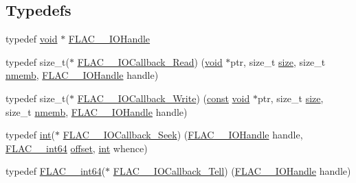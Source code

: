 \subsection*{Typedefs}
\begin{DoxyCompactItemize}
\item 
typedef \hyperlink{sound_8c_ae35f5844602719cf66324f4de2a658b3}{void} $\ast$ \hyperlink{group__flac__callbacks_ga4c329c3168dee6e352384c5e9306260d}{F\+L\+A\+C\+\_\+\+\_\+\+I\+O\+Handle}
\item 
typedef size\+\_\+t($\ast$ \hyperlink{group__flac__callbacks_ga49d95218a6c09b215cd92cc96de71bf9}{F\+L\+A\+C\+\_\+\+\_\+\+I\+O\+Callback\+\_\+\+Read}) (\hyperlink{sound_8c_ae35f5844602719cf66324f4de2a658b3}{void} $\ast$ptr, size\+\_\+t \hyperlink{group__lavu__mem_ga854352f53b148adc24983a58a1866d66}{size}, size\+\_\+t \hyperlink{group__lavu__mem_ga79fd723df92f68cf8a6207a1d98b4c01}{nmemb}, \hyperlink{group__flac__callbacks_ga4c329c3168dee6e352384c5e9306260d}{F\+L\+A\+C\+\_\+\+\_\+\+I\+O\+Handle} handle)
\item 
typedef size\+\_\+t($\ast$ \hyperlink{group__flac__callbacks_gad991792235879aecae289b56a112e1b8}{F\+L\+A\+C\+\_\+\+\_\+\+I\+O\+Callback\+\_\+\+Write}) (\hyperlink{getopt1_8c_a2c212835823e3c54a8ab6d95c652660e}{const} \hyperlink{sound_8c_ae35f5844602719cf66324f4de2a658b3}{void} $\ast$ptr, size\+\_\+t \hyperlink{group__lavu__mem_ga854352f53b148adc24983a58a1866d66}{size}, size\+\_\+t \hyperlink{group__lavu__mem_ga79fd723df92f68cf8a6207a1d98b4c01}{nmemb}, \hyperlink{group__flac__callbacks_ga4c329c3168dee6e352384c5e9306260d}{F\+L\+A\+C\+\_\+\+\_\+\+I\+O\+Handle} handle)
\item 
typedef \hyperlink{xmltok_8h_a5a0d4a5641ce434f1d23533f2b2e6653}{int}($\ast$ \hyperlink{group__flac__callbacks_gab3942bbbd6ae09bcefe7cb3a0060c49c}{F\+L\+A\+C\+\_\+\+\_\+\+I\+O\+Callback\+\_\+\+Seek}) (\hyperlink{group__flac__callbacks_ga4c329c3168dee6e352384c5e9306260d}{F\+L\+A\+C\+\_\+\+\_\+\+I\+O\+Handle} handle, \hyperlink{ordinals_8h_a12b57f75f760b9062a13bcda1bdb3f3e}{F\+L\+A\+C\+\_\+\+\_\+int64} \hyperlink{layer12_8c_a33d71f23ba2052d17f0b754dc35265b0}{offset}, \hyperlink{xmltok_8h_a5a0d4a5641ce434f1d23533f2b2e6653}{int} whence)
\item 
typedef \hyperlink{ordinals_8h_a12b57f75f760b9062a13bcda1bdb3f3e}{F\+L\+A\+C\+\_\+\+\_\+int64}($\ast$ \hyperlink{group__flac__callbacks_ga45314930cabc2e9c04867eae6bca309f}{F\+L\+A\+C\+\_\+\+\_\+\+I\+O\+Callback\+\_\+\+Tell}) (\hyperlink{group__flac__callbacks_ga4c329c3168dee6e352384c5e9306260d}{F\+L\+A\+C\+\_\+\+\_\+\+I\+O\+Handle} handle)

\end{DoxyCompactItemize}
